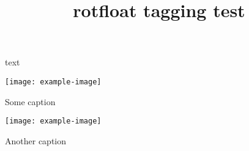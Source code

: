\documentclass{article}
\title{rotfloat tagging test}
\begin{document}
text
\begin{program}
\centering
\texttt{[image: example-image]}
\caption{Some caption}
\end{program}

\begin{sidewaysprogram}
\centering
\texttt{[image: example-image]}
\caption{Another caption}
\end{sidewaysprogram}
\end{document}
